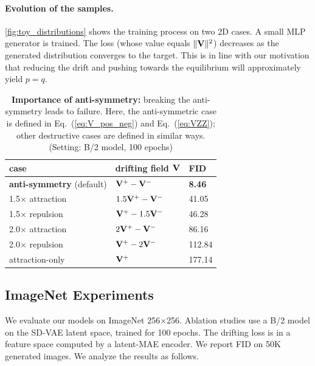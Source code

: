 \paragraph{Evolution of the samples.}
\cref{fig:toy_distributions} shows the training process
on two 2D cases. A small MLP generator is trained.
The loss (whose value equals $\|\mathbf{V}\|^2$) decreases as the generated distribution converges to the target.
This is in line with our motivation that reducing the drift and pushing towards the equilibrium will approximately yield $p = q$.




\begin{table}[t]
\caption{
\textbf{Importance of anti-symmetry:}
breaking the anti-symmetry leads to failure. Here, the anti-symmetric case is defined in Eq.~(\ref{eq:V_pos_neg}) and Eq.~(\ref{eq:VZZ});
other destructive cases are defined in similar ways.
(Setting: B/2 model, 100 epochs)
}
\label{tab:ablation_antisymmetry}
\tablefontsize
\begin{tabular}{y{100}x{60}z{35}}
\toprule
case & drifting field $\mathbf{V}$ & FID \\
\midrule
\textbf{anti-symmetry} (default) & $\mathbf{V}^+ - \mathbf{V}^-$ & \textbf{8.46} \\
$\times$ attraction & $1.5\mathbf{V}^+ - \mathbf{V}^-$ & 41.05 \\
1.5$\times$ repulsion & $\mathbf{V}^+ - 1.5\mathbf{V}^-$ & 46.28 \\
2.0$\times$ attraction & $2\mathbf{V}^+ - \mathbf{V}^-$ & 86.16 \\
2.0$\times$ repulsion & $\mathbf{V}^+ - 2\mathbf{V}^-$ & 112.84 \\
attraction-only & $\mathbf{V}^+$ & 177.14 \\
\bottomrule
\end{tabular}
\end{table}

\subsection{ImageNet Experiments}

We evaluate our models on ImageNet 256$\times$256. Ablation studies use a B/2 model on the SD-VAE latent space, trained for 100 epochs.
The drifting loss is in a feature space computed by a latent-MAE encoder.
We report FID \cite{fid} on 50K generated images.
We analyze the results as follows.

